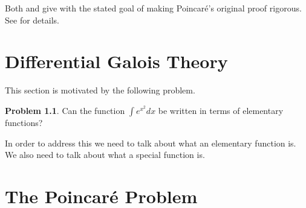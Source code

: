 \documentclass[12pt]{book}
\numberwithin{equation}{section}
\theoremstyle{definition}
\newtheorem{problem}[theorem]{Problem}
\theoremstyle{remark}
\begin{document}
Both \cite{Pan2004} and \cite{Matsuda1978} give with the stated goal of making Poincar\'e's original proof rigorous. 
See \cite{Matsuda1978} for details.









\chapter[Differential Galois Theory]{Differential Galois Theory}

This section is motivated by the following problem.
\begin{problem}
	Can the function $\int e^{x^2} dx$ be written in terms of elementary functions?
\end{problem}
In order to address this we need to talk about what an elementary function is. 
We also need to talk about what a special function is. 

\chapter[Poincar\'e Problem]{The Poincar\'e Problem}
\end{document}
